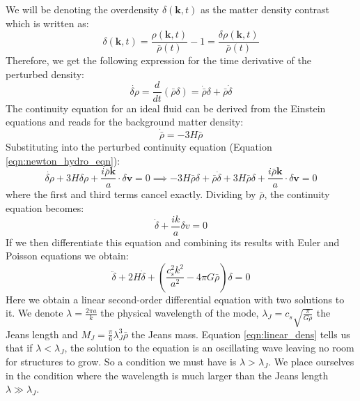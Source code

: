 We will be denoting the overdensity $\delta(\mathbf{k},t)$ as the matter density 
contrast which is written as:
\begin{equation}
    \delta(\mathbf{k}, t) = \frac{\rho(\mathbf{k},t)}{\bar{\rho}(t)} - 1 = 
    \frac{\delta \rho (\mathbf{k}, t)}{\bar{\rho}(t)}
\end{equation}
Therefore, we get the following expression for the time derivative of the 
perturbed density:
\begin{equation}
    \dot{\delta\rho} = \frac{d}{dt}(\bar{\rho}\delta) = \dot{\bar{\rho}}\delta 
    + \bar{\rho}\dot{\delta}
\end{equation}
The continuity equation for an ideal fluid can be derived from the Einstein equations and reads for the background matter density:
\begin{equation}
    \dot{\bar{\rho}} = -3H\bar{\rho}
\end{equation}
Substituting into the perturbed continuity equation 
(Equation \ref{eqn:newton_hydro_eqn}):
\begin{equation}
    \dot{\delta\rho} + 3H\delta\rho + \frac{i\bar{\rho}\mathbf{k}}{a} \cdot 
    \delta\mathbf{v} = 0 \implies -3H\bar{\rho}\delta + \bar{\rho}\dot{\delta} 
    + 3H\bar{\rho}\delta + \frac{i\bar{\rho}\mathbf{k}}{a} \cdot \delta\mathbf{v} 
    = 0
\end{equation}
where the first and third terms cancel exactly. Dividing by $\bar{\rho}$, the 
continuity equation becomes:
\begin{equation}
    \dot{\delta} + \frac{ik}{a}\delta v = 0
\end{equation}
If we then differentiate this equation and combining its results with Euler and Poisson equations we obtain:
\begin{equation}
    \ddot{\delta} + 2 H \dot{\delta} + \left( \frac{c_s^2 k^2}{a^2} - 4\pi G \bar{\rho} \right)\delta = 0
    \label{eqn:linear_dens}
\end{equation}
Here we obtain a linear second-order differential equation with two solutions to it. 
We denote $\lambda = \frac{2\pi a}{k}$ the physical wavelength of the mode, 
$\lambda_J = c_s \sqrt{\frac{\pi}{G\rho}} $ the Jeans length and $M_J = \frac{\pi}{6} \lambda_J^3 \bar{\rho} $ the Jeans mass. Equation \ref{eqn:linear_dens} tells us that 
if $\lambda < \lambda_J$, the solution to the equation is an oscillating wave leaving no room for structures to grow. So a condition we must have is $\lambda > \lambda_J$. We 
place ourselves in the condition where the wavelength is much larger than the Jeans length $\lambda \gg \lambda_J$. 
